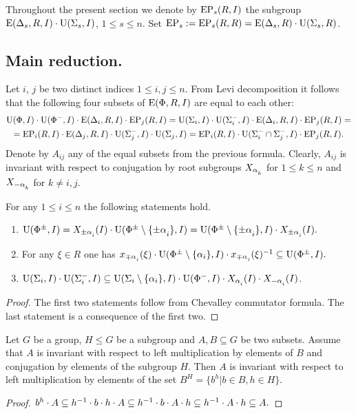 Throughout the present section we denote by $\operatorname{EP}_s(R, I)$ the subgroup $\operatorname{E}(\Delta_s, R, I) \cdot \operatorname{U}(\Sigma_s, I)$, $1 \leq s \leq n$.
Set $\operatorname{EP}_s := \operatorname{EP}_s(R, R) = \operatorname{E}(\Delta_s, R) \cdot \operatorname{U}(\Sigma_s, R)$. 

\subsection{Main reduction.}
Let $i$, $j$ be two distinct indices $1\leq i,j \leq n$. From Levi decomposition it follows that the following four subsets of $\operatorname{E}(\Phi, R, I)$ are equal to each other:
\begin{multline}\nonumber \operatorname{U}(\Phi, I)\cdot \operatorname{U}(\Phi^-, I) \cdot \operatorname{E}(\Delta_i, R, I) \cdot \operatorname{EP}_j(R, I) = \operatorname{U}(\Sigma_i, I)\cdot \operatorname{U}(\Sigma^-_i, I) \cdot \operatorname{E}(\Delta_i, R, I) \cdot \operatorname{EP}_j(R, I) = \\
= \operatorname{EP}_i(R, I) \cdot \operatorname{E}(\Delta_j, R, I) \cdot \operatorname{U}(\Sigma_j^-, I)\cdot \operatorname{U}(\Sigma_j, I) = \operatorname{EP}_i(R, I) \cdot \operatorname{U}(\Sigma^-_i\cap \Sigma^-_j, I) \cdot \operatorname{EP}_j(R, I). \end{multline}
Denote by $A_{ij}$ any of the equal subsets from the previous formula. 
Clearly, $A_{ij}$ is invariant with respect to conjugation by root subgroups $X_{\alpha\ssub{k}}$ for $1\leq k\leq n$ and $X_{-\alpha\ssub{k}}$ for $k\neq i,j$.

\begin{lemma}\label{lemma:dv_unipotent} For any $1\leq i\leq n$ the following statements hold. \begin{enumerate} 
\item $\U(\Phi^\pm, I) = X_{\pm\alpha\ssub{i}}(I)\cdot \U(\Phi^\pm\setminus\{\pm\alpha\ssub{i}\}, I) = \U(\Phi^\pm\setminus\{\pm\alpha\ssub{i}\}, I)\cdot X_{\pm\alpha\ssub{i}}(I).$
\item For any $\xi\in R$ one has $x_{\mp\alpha\ssub{i}}(\xi)\cdot \U(\Phi^\pm\setminus\{\alpha_i\}, I)\cdot x_{\mp\alpha\ssub{i}}(\xi)^{-1} \subseteq \U(\Phi^\pm, I).$
\item $\U(\Sigma_i, I)\cdot \U(\Sigma^-_i, I) \subseteq \U(\Sigma_i\setminus \{\alpha_i\}, I) \cdot \U(\Phi^-, I) \cdot X_{\alpha\ssub{i}}(I) \cdot X_{-\alpha\ssub{i}}(I)$.
\end{enumerate} \end{lemma}
\begin{proof}
 The first two statements follow from Chevalley commutator formula. The last statement is a consequence of the first two.
\end{proof}

\begin{lemma}\label{lemma:conj_lemma} Let $G$ be a group, $H\leq G$ be a subgroup and $A, B\subseteq G$ be two subsets.
Assume that $A$ is invariant with respect to left multiplication by elements of $B$ and conjugation by elements of the subgroup $H$.
Then $A$ is invariant with respect to left multiplication by elements of the set $B^H = \{b^h \vert b\in B, h\in H\}$. \end{lemma}
\begin{proof} $b^h \cdot A \subseteq h^{-1}\cdot b \cdot h \cdot A \subseteq h^{-1} \cdot b \cdot A \cdot h \subseteq h^{-1} \cdot A \cdot h \subseteq A. \qedhere$ \end{proof}

